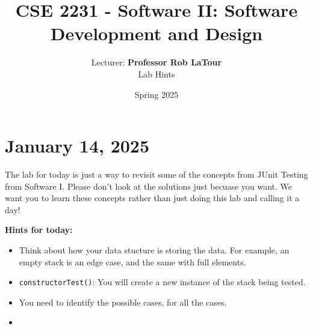 \documentclass[11pt]{article}
\title{CSE 2231 - Software II: Software Development and Design}
\author{Lecturer: \textbf{Professor Rob LaTour}\\Lab Hints}
\date{Spring 2025}
\begin{document}
\maketitle


\section{January 14, 2025}
The lab for today is just a way to revisit some of the concepts from JUnit
Testing from Software I. Please don't look at the solutions just becuase you
want. We want you to learn these concepts rather than just doing this lab and
calling it a day!

\textbf{Hints for today:}
\begin{itemize}
    \item Think about how your data stucture is storing the data. For example, an empty
          stack is an edge case, and the same with full elements.
    \item \texttt{constructorTest()}: You will create a new instance of the stack being tested.
    \item You need to identify the possible cases, for all the cases.
    \item
\end{itemize}
\end{document}

